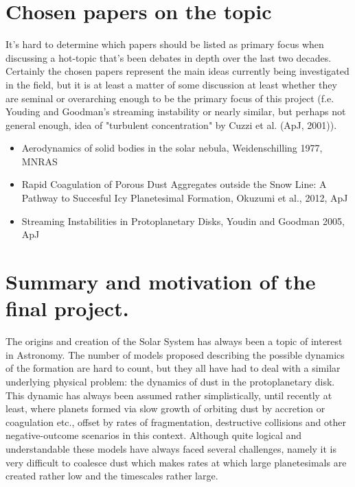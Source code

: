 \documentclass[12pt,letterpaper]{article}
\begin{document}
\section*{Chosen papers on the topic}

It's hard to determine which papers should be listed as primary focus when discussing a hot-topic that's been debates in depth over the last two decades. Certainly the chosen papers represent the main ideas currently being investigated in the field, but it is at least a matter of some discussion at least whether they are seminal or overarching enough to be the primary focus of this project (f.e. Youding and Goodman's streaming instability or nearly similar, but perhaps not general enough, idea of "turbulent concentration" by Cuzzi et al. (ApJ, 2001)). 
\begin{itemize}
    \item Aerodynamics of solid bodies in the solar nebula, Weidenschilling 1977, MNRAS
    \item Rapid Coagulation of Porous Dust Aggregates outside the Snow Line: A Pathway to Succesful Icy Planetesimal Formation, Okuzumi et al., 2012, ApJ
    \item Streaming Instabilities in Protoplanetary Disks, Youdin and Goodman 2005, ApJ
\end{itemize}


\section*{Summary and motivation of the final project.}

The origins and creation of the Solar System has always been a topic of interest in Astronomy. The number of models proposed describing the possible dynamics of the formation are hard to count, but they all have had to deal with a similar underlying physical problem: the dynamics of dust in the protoplanetary disk. This dynamic has always been assumed rather simplistically, until recently at least, where planets formed via slow growth of orbiting dust by accretion or coagulation etc., offset by rates of fragmentation, destructive collisions and other negative-outcome scenarios in this context. Although quite logical and understandable these models have always faced several challenges, namely it is very difficult to coalesce dust which makes rates at which large planetesimals are created rather low and the timescales rather large. 
\end{document}
